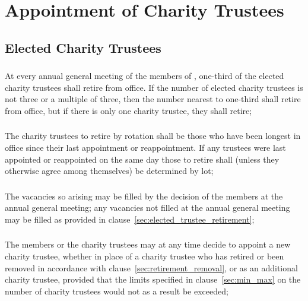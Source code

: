 \section{Appointment of Charity Trustees}\label{sec:appointment}

    \subsection{Elected Charity Trustees}

        \subsubsection{}
        At every annual general meeting of the members of \shortname{}, one-third of the elected charity trustees shall retire from office. If the number of elected charity trustees is not three or a multiple of three, then the number nearest to one-third shall retire from office, but if there is only one charity trustee, they shall retire;

        \subsubsection{}\label{sec:rotation_retirement}
        The charity trustees to retire by rotation shall be those who have been longest in office since their last appointment or reappointment. If any trustees were last appointed or reappointed on the same day those to retire shall (unless they otherwise agree among themselves) be determined by lot;

        \subsubsection{}\label{sec:trustee_vacancy}
        The vacancies so arising may be  filled by the decision of the members at the annual general meeting; any vacancies not  filled at the annual general meeting may be  filled as provided in clause~\ref{sec:elected_trustee_retirement};

        \subsubsection{}
        The members or the charity trustees may at any time decide to appoint a new charity trustee, whether in place of a charity trustee who has retired or been removed in accordance with clause~\ref{sec:retirement_removal}, or as an additional charity trustee, provided that the limits specified in clause~\ref{sec:min_max} on the number of charity trustees would not as a result be exceeded;

